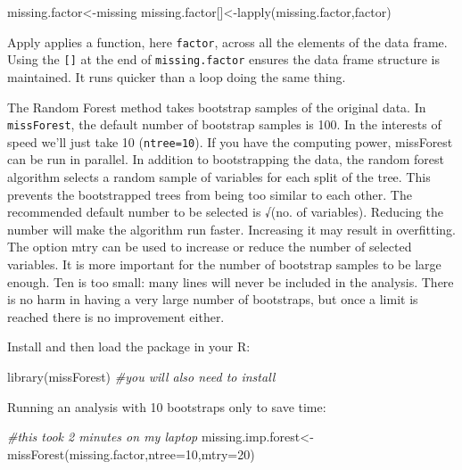 \documentclass[
]{book}
\newenvironment{Shaded}{\begin{snugshade}}{\end{snugshade}}
\newcommand{\AttributeTok}[1]{\textcolor[rgb]{0.77,0.63,0.00}{#1}}
\newcommand{\CommentTok}[1]{\textcolor[rgb]{0.56,0.35,0.01}{\textit{#1}}}
\newcommand{\DecValTok}[1]{\textcolor[rgb]{0.00,0.00,0.81}{#1}}
\newcommand{\FunctionTok}[1]{\textcolor[rgb]{0.00,0.00,0.00}{#1}}
\newcommand{\NormalTok}[1]{#1}
\newcommand{\OtherTok}[1]{\textcolor[rgb]{0.56,0.35,0.01}{#1}}
\begin{document}
\begin{Shaded}
\begin{Highlighting}[]
\NormalTok{missing.factor}\OtherTok{\textless{}{-}}\NormalTok{missing}
\NormalTok{missing.factor[]}\OtherTok{\textless{}{-}}\FunctionTok{lapply}\NormalTok{(missing.factor,factor)}
\end{Highlighting}
\end{Shaded}

Apply applies a function, here \texttt{factor}, across all the elements of the data frame. Using the \texttt{{[}{]}} at the end of \texttt{missing.factor} ensures the data frame structure is maintained. It runs quicker than a loop doing the same thing.

The Random Forest method takes bootstrap samples of the original data. In \texttt{missForest}, the default number of bootstrap samples is 100. In the interests of speed we'll just take 10 (\texttt{ntree=10}). If you have the computing power, missForest can be run in parallel. In addition to bootstrapping the data, the random forest algorithm selects a random sample of variables for each split of the tree. This prevents the bootstrapped trees from being too similar to each other. The recommended default number to be selected is √(no. of variables). Reducing the number will make the algorithm run faster. Increasing it may result in overfitting. The option mtry can be used to increase or reduce the number of selected variables. It is more important for the number of bootstrap samples to be large enough. Ten is too small: many lines will never be included in the analysis. There is no harm in having a very large number of bootstraps, but once a limit is reached there is no improvement either.

Install and then load the package in your R:

\begin{Shaded}
\begin{Highlighting}[]
\FunctionTok{library}\NormalTok{(missForest) }\CommentTok{\#you will also need to install}
\end{Highlighting}
\end{Shaded}

Running an analysis with 10 bootstraps only to save time:

\begin{Shaded}
\begin{Highlighting}[]
\CommentTok{\#this took 2 minutes on my laptop}
\NormalTok{missing.imp.forest}\OtherTok{\textless{}{-}}\FunctionTok{missForest}\NormalTok{(missing.factor,}\AttributeTok{ntree=}\DecValTok{10}\NormalTok{,}\AttributeTok{mtry=}\DecValTok{20}\NormalTok{)}
\end{Highlighting}
\end{Shaded}
\end{document}
